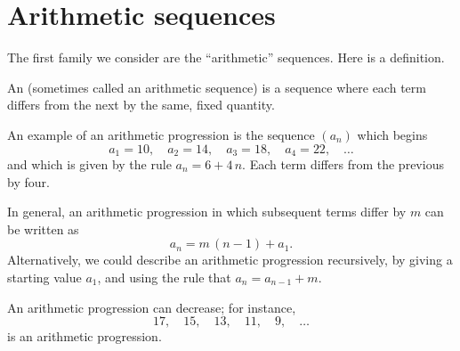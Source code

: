 \documentclass{ximera}
\begin{document}
\section{Arithmetic sequences}


The first family we consider are the ``arithmetic'' sequences.  Here
is a definition.



\begin{definition}
  An  (sometimes called an arithmetic
  sequence) is a sequence where each
  term differs from the next by the same, fixed quantity.
\end{definition}

\begin{example}
  An example of an arithmetic progression is the sequence $(a_n)$ which begins 
  $$
  a_1 = 10, \quad a_2 = 14, \quad a_3 = 18, \quad a_4 = 22, \quad\ldots
  $$
  and which is given by the rule $a_n = 6 + 4 \, n$.  Each term differs
  from the previous by four.
\end{example}

In general, an arithmetic progression in which subsequent terms differ
by $m$ can be written as
$$
a_n = m \, (n-1) + a_1.
$$
Alternatively, we could describe an arithmetic progression
recursively, by giving a starting value $a_1$, and using the rule that
$a_{n} = a_{n-1} + m$.


An arithmetic progression can decrease; for instance,
$$
17,\quad  15,\quad  13,\quad  11,\quad  9, \quad\ldots
$$
is an arithmetic progression.
\end{document}
